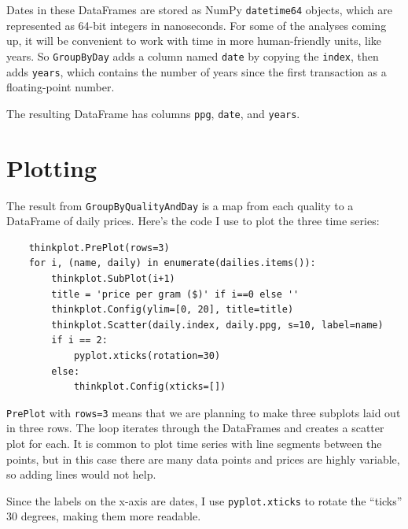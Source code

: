 \documentclass[12pt]{book}
\begin{document}
Dates in these DataFrames are stored as NumPy {\tt datetime64}
objects, which are represented as 64-bit integers in nanoseconds.
For some of the analyses coming up, it will be convenient to
work with time in more human-friendly units, like years.  So
{\tt GroupByDay} adds a column named {\tt date} by copying
the {\tt index}, then adds {\tt years}, which contains the number
of years since the first transaction as a floating-point number.

The resulting DataFrame has columns {\tt ppg}, {\tt date}, and
{\tt years}.


\section{Plotting}

The result from {\tt GroupByQualityAndDay} is a map from each quality
to a DataFrame of daily prices.  Here's the code I use to plot
the three time series:

\begin{verbatim}
    thinkplot.PrePlot(rows=3)
    for i, (name, daily) in enumerate(dailies.items()):
        thinkplot.SubPlot(i+1)
        title = 'price per gram ($)' if i==0 else ''
        thinkplot.Config(ylim=[0, 20], title=title)
        thinkplot.Scatter(daily.index, daily.ppg, s=10, label=name)
        if i == 2: 
            pyplot.xticks(rotation=30)
        else:
            thinkplot.Config(xticks=[])
\end{verbatim}

{\tt PrePlot} with {\tt rows=3} means that we are planning to
make three subplots laid out in three rows.  The loop iterates
through the DataFrames and creates a scatter plot for each.  It is
common to plot time series with line segments between the points,
but in this case there are many data points and prices are highly
variable, so adding lines would not help.

Since the labels on the x-axis are dates, I use {\tt pyplot.xticks}
to rotate the ``ticks'' 30 degrees, making them more readable.
\end{document}
